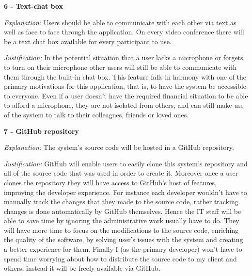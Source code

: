 \textsf{\bfseries 6 - Text-chat box} \\ \vspace{0.1cm}

\textit{Explanation:}
Users should be able to communicate with each other via text
as well as face to face through the application. On every
video conference there will be a text chat box available for
every participant to use. \vspace{0.1cm}

\textit{Justification:}
In the potential situation that a user
lacks a microphone or forgets to turn on their microphone other
users will still be able to communicate with them through the
built-in chat box. This feature falls in harmony with one of
the primary motivations for this application, that is, to have
the system be accessible to everyone. Even if a user doesn't
have the required financial situation to be able to afford a
microphone, they are not isolated from others, and can still
make use of the system to talk to their colleagues, friends
or loved ones. \vspace{0.2cm}

\textsf{\bfseries 7 - GitHub repository} \\ \vspace{0.1cm}

\textit{Explanation:}
The system's source code will be hosted in a GitHub
repository.
\vspace{0.1cm}

\textit{Justification:}
GitHub will enable users to easily clone this system's repository
and all of the source code that was used in order to create it.
Moreover once a user clones the repository they will have access
to GitHub's host of features, improving the developer experience.
For instance each developer wouldn't have to manually track the
changes that they made to the source code, rather tracking changes
is done automatically by GitHub themselves. Hence the IT staff
will be able to save time by ignoring the administrative work
usually have to do. They will have more time to focus on
the modifications to the source code, enriching the quality of
the software, by solving user's issues with the system and
creating a better experience for them. Finally I
(as the primary developer) won't
have to spend time worrying about how to distribute the source
code to my client and others, instead it will be freely
available via GitHub.\\ \vspace{0.2cm}


